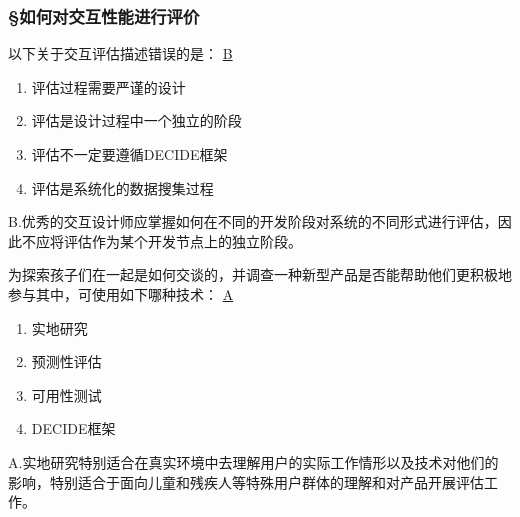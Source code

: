 \subsubsection*{\S 如何对交互性能进行评价}
\setcounter{problemname}{0}

\begin{problem}
	‍以下关于交互评估描述错误的是：
	\uline{B}    
    \vspace{-0.8em}
    \begin{multicols}{2}
        \begin{enumerate}[label=\Alph*.]
            \item 评估过程需要严谨的设计
            \item 评估是设计过程中一个独立的阶段
            \item 评估不一定要遵循DECIDE框架
            \item 评估是系统化的数据搜集过程
        \end{enumerate}
    \end{multicols}
    \vspace{-1em}
\end{problem}

\begin{solution}
B.优秀的交互设计师应掌握如何在不同的开发阶段对系统的不同形式进行评估，因此不应将评估作为某个开发节点上的独立阶段。
\end{solution}


\begin{problem}
	‍为探索孩子们在一起是如何交谈的，并调查一种新型产品是否能帮助他们更积极地参与其中，可使用如下哪种技术：
	\uline{A}    
    \vspace{-0.8em}
    \begin{multicols}{4}
        \begin{enumerate}[label=\Alph*.]
            \item 实地研究
            \item 预测性评估
            \item 可用性测试
            \item DECIDE框架
        \end{enumerate}
    \end{multicols}
    \vspace{-1em}
\end{problem}

\begin{solution}
A.实地研究特别适合在真实环境中去理解用户的实际工作情形以及技术对他们的影响，特别适合于面向儿童和残疾人等特殊用户群体的理解和对产品开展评估工作。
\end{solution}


